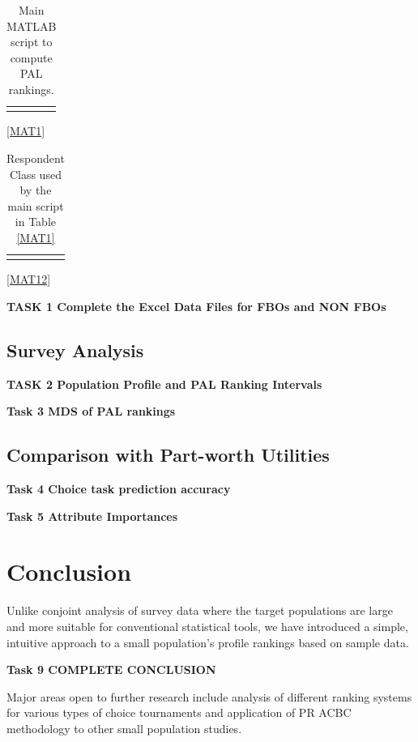 \documentclass[a4paper, 12pt]{article}
\begin{document}
\begin{table}[h]
	\flushleft
	\begin{tabular}{|l|}\toprule
		\parbox[b]{6.25in}{}\\\bottomrule
	\end{tabular}
\caption{Main MATLAB script to compute PAL rankings.}
	\ref{MAT1}
\end{table}

\begin{table}[h]
	\flushleft
	\begin{tabular}{|l|}\toprule
		\parbox[b]{6.25in}{}\\\bottomrule
	\end{tabular}
	\caption{Respondent Class used by the main script in Table \ref{MAT1}}
		\ref{MAT12}
	\end{table}



{\bf TASK 1 Complete the Excel Data Files for FBOs and NON FBOs}


\subsection{Survey Analysis}

{\bf TASK 2 Population Profile and PAL Ranking Intervals}



{\bf Task 3 MDS of PAL rankings }


\subsection{Comparison with Part-worth Utilities}

{\bf Task 4 Choice task prediction accuracy}

{\bf Task 5 Attribute Importances}




\section{Conclusion}
Unlike conjoint analysis of survey data where the target populations are large and more suitable for conventional statistical tools, we have introduced a simple, intuitive approach to a small population's profile rankings based on sample data. 

{\bf Task 9 COMPLETE CONCLUSION}

Major areas open to further research include analysis of  different ranking systems for various types of choice tournaments and application of PR ACBC methodology to other small population studies.
\end{document}
